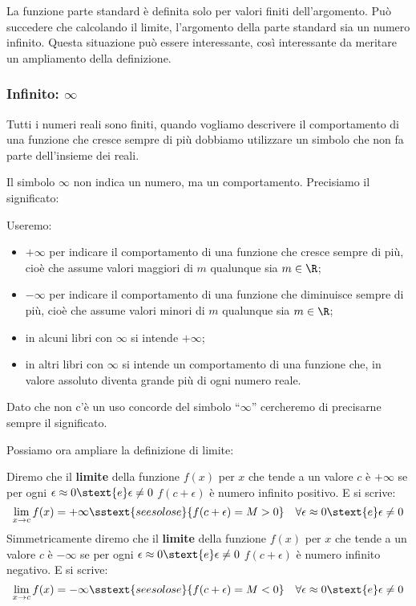 La funzione parte standard è definita solo per valori finiti 
dell'argomento.
Può succedere che calcolando il limite, l'argomento della parte standard sia  
un numero infinito. Questa situazione può essere interessante, così 
interessante da meritare un ampliamento della definizione.

\subsubsection{Infinito: \(\infty\)}

Tutti i numeri reali sono finiti, quando vogliamo descrivere il comportamento 
di una funzione che cresce sempre di più dobbiamo utilizzare un simbolo che 
non fa parte dell'insieme dei reali. 

Il simbolo \(\infty\) non indica un numero, ma un comportamento.
Precisiamo il significato:

\begin{definizione}
Useremo:
\begin{itemize}
\item \(+\infty\) per indicare il comportamento di una funzione che cresce 
sempre di più, 
cioè che assume valori maggiori di \(m\) qualunque sia \(m \in \R\);
\item \(-\infty\) per indicare il comportamento di una funzione che 
diminuisce sempre di più, 
cioè che assume valori minori di \(m\) qualunque sia \(m \in \R\);
\item in alcuni libri con \(\infty\) si intende \(+\infty\); 
\item in altri libri con \(\infty\) si intende un comportamento di una 
funzione che, in valore assoluto diventa grande più di ogni numero reale.
\end{itemize}
\end{definizione}

Dato che non c'è un uso concorde del simbolo ``\(\infty\)'' cercheremo 
di precisarne sempre il significato.

Possiamo ora ampliare la definizione di limite:
\begin{definizione}
Diremo che il \textbf{limite} della funzione \(f(x)\) 
per \(x\) che tende a un valore \(c\) è \(+\infty\) 
se per ogni \(\epsilon \approx 0 \stext{ e } \epsilon \neq 0\) 
\(f(c + \epsilon)\) è numero infinito positivo. \quad 
E si scrive:
\[\lim_{x \rightarrow c} f(x) = +\infty \sstext{se e solo se} 
{f(c + \epsilon) = M > 0} \quad 
\forall \epsilon \approx 0 \stext{ e } \epsilon \neq 0\]
Simmetricamente diremo che il \textbf{limite} della funzione \(f(x)\) 
per \(x\) che tende a un valore \(c\) è \(-\infty\) 
se per ogni \(\epsilon \approx 0 \stext{ e } \epsilon \neq 0\) 
\(f(c + \epsilon)\) è numero infinito negativo. \quad 
E si scrive:
\[\lim_{x \rightarrow c} f(x) = -\infty \sstext{se e solo se} 
{f(c + \epsilon) = M < 0} \quad 
\forall \epsilon \approx 0 \stext{ e } \epsilon \neq 0\]
\end{definizione}

